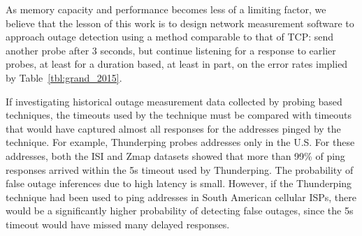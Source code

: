 As memory capacity and performance becomes less of a
limiting factor, we believe that the lesson of this work is
to design network measurement software to approach outage
detection using a method comparable to that of TCP: send
another probe after 3 seconds, but continue listening for a
response to earlier probes, at least for a duration based, at
least in part, on the error rates implied by
Table~\ref{tbl:grand_2015}. 



If investigating historical outage measurement data collected by
probing based techniques, the timeouts used by the technique must be
compared with timeouts that would have captured almost all responses
for the addresses pinged by the technique. For example, Thunderping
probes addresses only in the U.S. For these addresses, both the ISI
and Zmap datasets showed that more than 99\% of ping responses arrived
within the 5s timeout used by Thunderping. The probability of false
outage inferences due to high latency is small. However, if the Thunderping
technique had been used to ping addresses in South American cellular
ISPs, there would be a significantly higher probability of detecting
false outages, since the 5s timeout would have missed many delayed responses.



 

